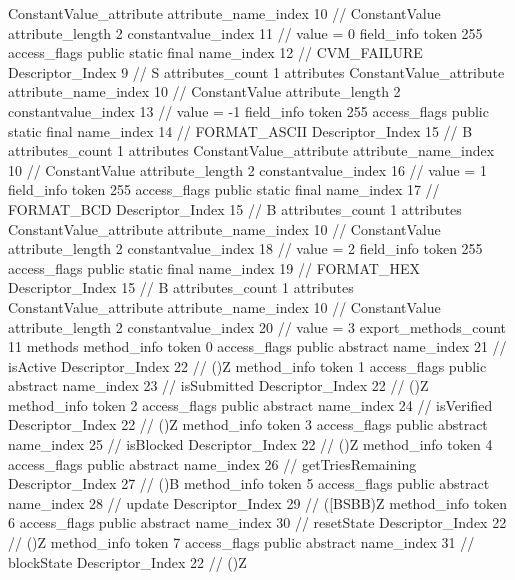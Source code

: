 {{{{{{				ConstantValue_attribute {
					attribute_name_index	10		// ConstantValue
					attribute_length	2
					constantvalue_index	11		// value = 0
				}
				}
			}
			field_info {
				token	255
				access_flags	public static final
				name_index	12		// CVM_FAILURE
				Descriptor_Index	9		// S
				attributes_count	1
				attributes {
				ConstantValue_attribute {
					attribute_name_index	10		// ConstantValue
					attribute_length	2
					constantvalue_index	13		// value = -1
				}
				}
			}
			field_info {
				token	255
				access_flags	public static final
				name_index	14		// FORMAT_ASCII
				Descriptor_Index	15		// B
				attributes_count	1
				attributes {
				ConstantValue_attribute {
					attribute_name_index	10		// ConstantValue
					attribute_length	2
					constantvalue_index	16		// value = 1
				}
				}
			}
			field_info {
				token	255
				access_flags	public static final
				name_index	17		// FORMAT_BCD
				Descriptor_Index	15		// B
				attributes_count	1
				attributes {
				ConstantValue_attribute {
					attribute_name_index	10		// ConstantValue
					attribute_length	2
					constantvalue_index	18		// value = 2
				}
				}
			}
			field_info {
				token	255
				access_flags	public static final
				name_index	19		// FORMAT_HEX
				Descriptor_Index	15		// B
				attributes_count	1
				attributes {
				ConstantValue_attribute {
					attribute_name_index	10		// ConstantValue
					attribute_length	2
					constantvalue_index	20		// value = 3
				}
				}
			}
			}
			export_methods_count	11
			methods {
				method_info {
					token	0
					access_flags	public abstract
					name_index	21		// isActive
					Descriptor_Index	22		// ()Z
				}
				method_info {
					token	1
					access_flags	public abstract
					name_index	23		// isSubmitted
					Descriptor_Index	22		// ()Z
				}
				method_info {
					token	2
					access_flags	public abstract
					name_index	24		// isVerified
					Descriptor_Index	22		// ()Z
				}
				method_info {
					token	3
					access_flags	public abstract
					name_index	25		// isBlocked
					Descriptor_Index	22		// ()Z
				}
				method_info {
					token	4
					access_flags	public abstract
					name_index	26		// getTriesRemaining
					Descriptor_Index	27		// ()B
				}
				method_info {
					token	5
					access_flags	public abstract
					name_index	28		// update
					Descriptor_Index	29		// ([BSBB)Z
				}
				method_info {
					token	6
					access_flags	public abstract
					name_index	30		// resetState
					Descriptor_Index	22		// ()Z
				}
				method_info {
					token	7
					access_flags	public abstract
					name_index	31		// blockState
					Descriptor_Index	22		// ()Z
}}}}}

